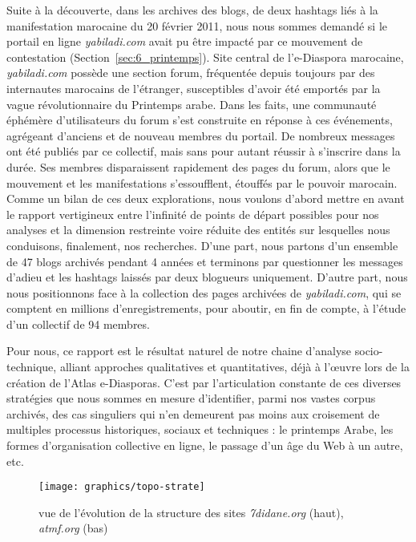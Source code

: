 \documentclass[symmetric,justified,marginals=raggedouter]{tufte-book}
\begin{document}
Suite à la découverte, dans les archives des blogs, de deux hashtags liés à la manifestation marocaine du 20 février 2011, nous nous sommes demandé si le portail en ligne \textit{yabiladi.com} avait pu être impacté par ce mouvement de contestation (Section~\ref{sec:6_printemps}). Site central de l'e-Diaspora marocaine, \textit{yabiladi.com} possède une section forum, fréquentée depuis toujours par des internautes marocains de l'étranger, susceptibles d'avoir été emportés par la vague révolutionnaire du Printemps arabe. Dans les faits, une communauté éphémère d'utilisateurs du forum s'est construite en réponse à ces événements, agrégeant d'anciens et de nouveau membres du portail. De nombreux messages ont été publiés par ce collectif, mais sans pour autant réussir à s'inscrire dans la durée. Ses membres disparaissent rapidement des pages du forum, alors que le mouvement et les manifestations s'essoufflent, étouffés par le pouvoir marocain. \\

\noindent Comme un bilan de ces deux explorations, nous voulons d'abord mettre en avant le rapport vertigineux entre l'infinité de points de départ possibles pour nos analyses et la dimension restreinte voire réduite des entités sur lesquelles nous conduisons, finalement, nos recherches. D'une part, nous partons d'un ensemble de 47 blogs archi\-vés pendant 4 années et terminons par questionner les messages d'adieu et les hashtags laissés par deux blogueurs uniquement. D'autre part, nous nous positionnons face à la collection des pages archivées de \textit{yabiladi.com}, qui se comptent en millions d'enregistrements, pour aboutir, en fin de compte, à l'étude d'un collectif de 94 membres. 

Pour nous, ce rapport est le résultat naturel de notre chaine d'analyse socio-technique, alliant approches qualitatives et quantitatives, déjà à l'œuvre lors de la création de l'Atlas e-Diasporas. C'est par l'articulation constante de ces diverses stratégies que nous sommes en mesure d'iden\-tifier, parmi nos vastes corpus archivés, des cas singuliers qui n'en demeurent pas moins aux croisement de multiples processus historiques, sociaux et techniques : le printemps Arabe, les formes d'organisation collective en ligne, le passage d'un âge du Web à un autre, etc. 

\begin{figure*}%
  \texttt{[image: graphics/topo-strate]}
  \caption{vue de l'évolution de la structure des sites \textit{7didane.org} (haut), \textit{atmf.org} (bas)}
  \label{fig:topo-strate}
\end{figure*}
\end{document}
